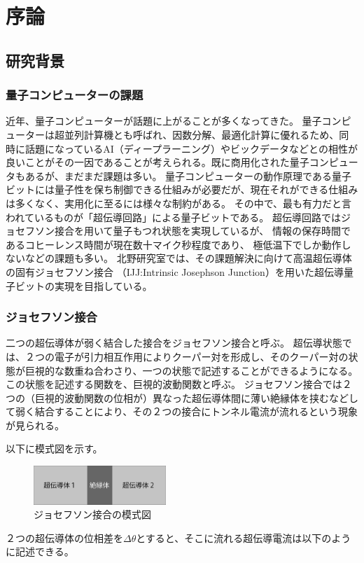 \chapter{序論}


\section{研究背景}
\subsection{量子コンピューターの課題}
近年、量子コンピューターが話題に上がることが多くなってきた。
量子コンピューターは超並列計算機とも呼ばれ、因数分解、最適化計算に優れるため、同時に話題になっているAI（ディープラーニング）やビックデータなどとの相性が良いことがその一因であることが考えられる。既に商用化された量子コンピュータもあるが、まだまだ課題は多い。
量子コンピューターの動作原理である量子ビットには量子性を保ち制御できる仕組みが必要だが、現在それができる仕組みは多くなく、実用化に至るには様々な制約がある。
その中で、最も有力だと言われているものが「超伝導回路」による量子ビットである。
超伝導回路ではジョセフソン接合を用いて量子もつれ状態を実現しているが、
情報の保存時間であるコヒーレンス時間が現在数十マイク秒程度であり、
極低温下でしか動作しないなどの課題も多い。
北野研究室では、その課題解決に向けて高温超伝導体の固有ジョセフソン接合
（IJJ:Intrinsic Josephson Junction）を用いた超伝導量子ビットの実現を目指している。

\subsection{ジョセフソン接合}
二つの超伝導体が弱く結合した接合をジョセフソン接合と呼ぶ。
超伝導状態では、２つの電子が引力相互作用によりクーパー対を形成し、そのクーパー対の状態が巨視的な数重ね合わさり、一つの状態で記述することができるようになる。
この状態を記述する関数を、巨視的波動関数と呼ぶ。
ジョセフソン接合では２つの（巨視的波動関数の位相が）異なった超伝導体間に薄い絶縁体を挟むなどして弱く結合することにより、その２つの接合にトンネル電流が流れるという現象が見られる。

以下に模式図を示す。
\vspace{10 mm}

\begin{figure}[h]
  \begin{center}
    \includegraphics[width=5cm]{./image/JJ.png}
    \caption{ジョセフソン接合の模式図}
    \label{fig:JJ}
  \end{center}
\end{figure}
２つの超伝導体の位相差を$ \Delta \theta $とすると、そこに流れる超伝導電流は以下のように記述できる。

